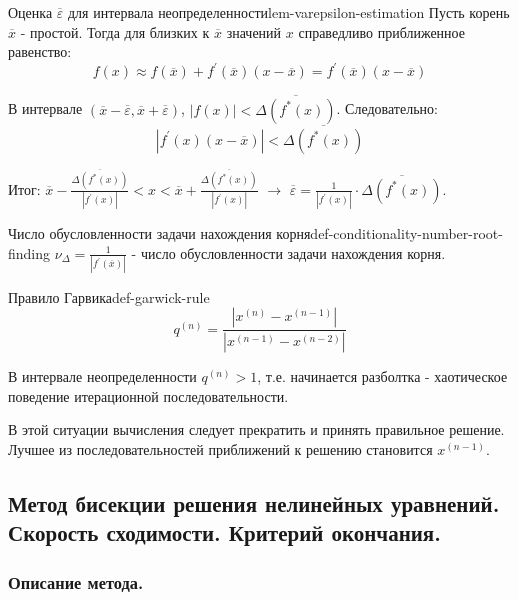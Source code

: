 \documentclass[14pt]{extarticle}
\begin{document}
        \begin{lemma}{Оценка $\overline{\varepsilon}$ для интервала неопределенности}{lem-varepsilon-estimation}
            Пусть корень $\overline{x}$ - простой. Тогда для близких к $\overline{x}$ значений $x$ справедливо приближенное равенство:
            $$f(x) \approx f(\overline{x}) + f^{'}(\overline{x})(x - \overline{x}) = f^{'}(\overline{x})(x - \overline{x})$$
        
            В интервале $(\overline{x} - \overline{\varepsilon}, \overline{x} + \overline{\varepsilon})$, $|f(x)| < \overline{\Delta(f^{*}(x))}$. Следовательно:
            $$|f^{'}(x)(x - \overline{x})| < \overline{\Delta(f^{*}(x))}$$

            Итог: $\overline{x} - \frac{\overline{\Delta(f^{*}(x))}}{|f^{'}(x)|} < x < \overline{x} + \frac{\overline{\Delta(f^{*}(x))}}{|f^{'}(x)|}$ $\rightarrow$ $\overline{\varepsilon} = \frac{1}{|f^{'}(x)|} \cdot \overline{\Delta(f^{*}(x))}$.
        \end{lemma}

        \begin{definition}{Число обусловленности задачи нахождения корня}{def-conditionality-number-root-finding}
            $\nu_{\Delta} = \frac{1}{|f^{'}(\overline{x})|}$ - число обусловленности задачи нахождения корня.
        \end{definition}

        \begin{definition}{Правило Гарвика}{def-garwick-rule}
            $$q^{(n)} = \frac{|x^{(n)} - x^{(n - 1)}|}{|x^{(n - 1)} - x^{(n - 2)}|}$$

            В интервале неопределенности $q^{(n)} > 1$, т.е. начинается разболтка - хаотическое поведение итерационной последовательности.

            \vspace{\baselineskip}

            В этой ситуации вычисления следует прекратить и принять правильное решение. Лучшее из последовательностей приближений к решению становится $x^{(n-1)}$.
        \end{definition}

\clearpage
\subsection{Метод бисекции решения нелинейных уравнений. Скорость сходимости. Критерий окончания.}

    \subsubsection{Описание метода.}
\end{document}
